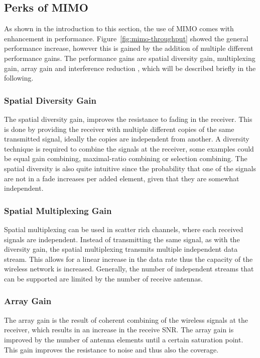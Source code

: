 \subsection{Perks of MIMO} 
As shown in the introduction to this section, the use of MIMO comes with enhancement in performance. Figure~\ref{fig:mimo-throughput} showed the general performance increase, however this is gained by the addition of multiple different performance gains. The performance gains are spatial diversity gain, multiplexing gain, array gain and interference reduction \cite{Ezio2007MIMO}, which will be described briefly in the following.

\subsubsection{Spatial Diversity Gain}
The spatial diversity gain, improves the resistance to fading in the receiver. This is done by providing the receiver with multiple different copies of the same transmitted signal, ideally the copies are independent from another. A diversity technique is required to combine the signals at the receiver\cite{Ezio2007MIMO}, some examples could be equal gain combining, maximal-ratio combining or selection combining. The spatial diversity is also quite intuitive since the probability that one of the signals are not in a fade increases per added element, given that they are somewhat independent. 
 
\subsubsection{Spatial Multiplexing Gain}
Spatial multiplexing can be used in scatter rich channels, where each received signals are independent. Instead of transmitting the same signal, as with the diversity gain, the spatial multiplexing transmits multiple independent data stream. This allows for a linear increase in the data rate thus the capacity of the wireless network is increased. Generally, the number of independent streams that can be supported are limited by the number of receive antennas. \cite{Tim2012Practical}

\subsubsection{Array Gain}
The array gain is the result of coherent combining of the wireless signals at the receiver, which results in an increase in the receive SNR. The array gain is improved by the number of antenna elements until a certain saturation point. This gain improves the resistance to noise and thus also the coverage. \cite{Tim2012Practical} 
  

